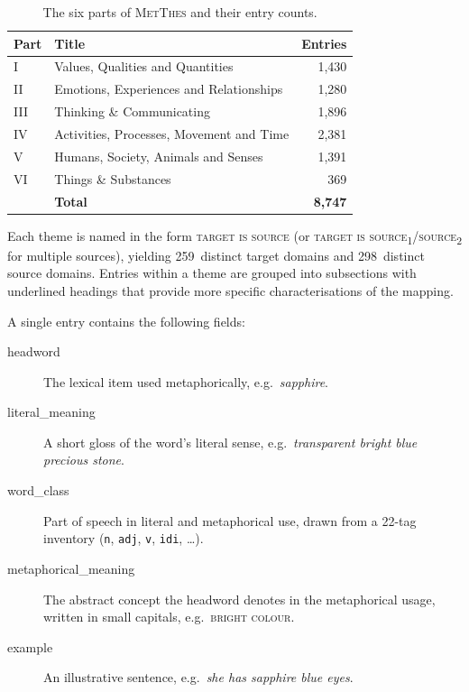 \documentclass[11pt,a4paper]{article}
\begin{document}
\begin{table}[ht]
\centering
\caption{The six parts of \textsc{MetThes} and their entry counts.}
\label{tab:parts}
\begin{tabular}{llr}
\toprule
Part & Title & Entries \\
\midrule
I   & Values, Qualities and Quantities          & 1,430 \\
II  & Emotions, Experiences and Relationships   & 1,280 \\
III & Thinking \& Communicating                 & 1,896 \\
IV  & Activities, Processes, Movement and Time  & 2,381 \\
V   & Humans, Society, Animals and Senses       & 1,391 \\
VI  & Things \& Substances                      &   369 \\
\midrule
    & \textbf{Total}                            & \textbf{8,747} \\
\bottomrule
\end{tabular}
\end{table}

Each theme is named in the form \textsc{target is source} (or
\textsc{target is source\textsubscript{1}/source\textsubscript{2}} for
multiple sources), yielding 259~distinct target domains and 298~distinct
source domains.
Entries within a theme are grouped into subsections with underlined
headings that provide more specific characterisations of the mapping.

A single entry contains the following fields:

\begin{description}
  \item[headword] The lexical item used metaphorically, e.g.\ \emph{sapphire}.
  \item[literal\_meaning] A short gloss of the word's literal sense,
    e.g.\ \emph{transparent bright blue precious stone}.
  \item[word\_class] Part of speech in literal and metaphorical use,
    drawn from a 22-tag inventory (\texttt{n}, \texttt{adj}, \texttt{v},
    \texttt{idi}, \ldots).
  \item[metaphorical\_meaning] The abstract concept the headword
    denotes in the metaphorical usage, written in small capitals,
    e.g.\ \textsc{bright colour}.
  \item[example] An illustrative sentence, e.g.\ \emph{she has sapphire
    blue eyes}.
\end{description}
\end{document}
